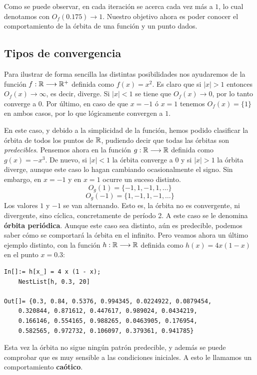 Como se puede observar, en cada iteración se acerca cada vez más a $1$, lo cual denotamos con $O_f(0.175)\rightarrow 1$. Nuestro objetivo ahora es poder conocer el comportamiento de la órbita de una función y un punto dados. 

\subsection{Tipos de convergencia}

Para ilustrar de forma sencilla las distintas posibilidades nos ayudaremos de la función $f:\mathbb{R}\longrightarrow\mathbb{R}^+$ definida como $f(x)=x^2$. Es claro que si $|x|>1$ entonces $O_f(x)\rightarrow\infty$, es decir, diverge. Si $|x|<1$ se tiene que $O_f(x)\rightarrow 0$, por lo tanto converge a $0$. Por último, en caso de que $x=-1$ ó $x=1$ tenemos $O_f(x)=\{1\}$ en ambos casos, por lo que lógicamente convergen a $1$.

En este caso, y debido a la simplicidad de la función, hemos podido clasificar la órbita de todos los puntos de $\mathbb{R}$, pudiendo decir que todas las órbitas son \textit{predecibles}. Pensemos ahora en la función $g:\mathbb{R}\longrightarrow\mathbb{R}$ definida como $g(x)=-x^3$. De nuevo, si $|x|<1$ la órbita converge a 0 y si $|x|>1$ la órbita diverge, aunque este caso lo hagan cambiando ocasionalmente el signo. Sin embargo, en $x=-1$ y en $x=1$ ocurre un suceso distinto.
$$
O_g(1) = \{-1,1,-1,1,\dots\}
$$
$$
O_g(-1) = \{1,-1,1,-1,\dots\}
$$
Los valores $1$ y $-1$ se van alternando. Esto es, la órbita no es convergente, ni divergente, sino cíclica, concretamente de período 2. A este caso se le denomina \textbf{órbita periódica}. Aunque este caso sea distinto, aún es predecible, podemos saber cómo se comportará la órbita en el infinito. Pero veamos ahora un último ejemplo distinto, con la función $h:\mathbb{R}\longrightarrow\mathbb{R}$ definida como $h(x)=4x(1-x)$ en el punto $x=0.3$:

\begin{verbatim}
In[]:= h[x_] = 4 x (1 - x);
    NestList[h, 0.3, 20]

Out[]= {0.3, 0.84, 0.5376, 0.994345, 0.0224922, 0.0879454, 
    0.320844, 0.871612, 0.447617, 0.989024, 0.0434219, 
    0.166146, 0.554165, 0.988265, 0.0463905, 0.176954, 
    0.582565, 0.972732, 0.106097, 0.379361, 0.941785}
\end{verbatim}

Esta vez la órbita no sigue ningún patrón predecible, y además se puede comprobar que es muy sensible a las condiciones iniciales. A esto le llamamos un comportamiento \textbf{caótico}.

